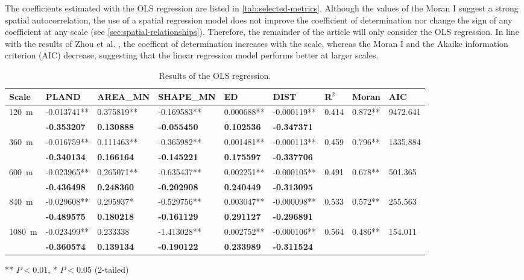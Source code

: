 \documentclass[12pt]{iopart}
\begin{document}
The coefficients estimated with the OLS regression are listed in \autoref{tab:selected-metrics}. Although the values of the Moran I \cite{moran1950notes} suggest a strong spatial autocorrelation, the use of a spatial regression model does not improve the coefficient of determination nor change the sign of any coefficient at any scale (see \ref{sec:spatial-relationships}). Therefore, the remainder of the article will only consider the OLS regression.
In line with the results of Zhou et al. \cite{zhou2017effects}, the coeffient of determination increases with the scale, whereas the Moran I and the Akaike information criterion (AIC) \cite{akaike1973information} decrease, suggesting that the linear regression model performs better at larger scales.

\begin{table}
  \caption{\label{tab:ols-regression} Results of the OLS regression.}
  \scriptsize %
  \begin{center}
    \begin{tabular}{ p{} p{} p{} p{} p{} p{} p{} p{} p{} }
      \toprule
      Scale & PLAND & AREA\_MN & SHAPE\_MN & ED & DIST & R$^2$ & Moran & AIC\\
      \midrule
      120~m & -0.013741** & 0.375819** & -0.169583** & 0.000688** & -0.000119** & 0.414 & 0.872** & 9472.641 \\
      & \textbf{-0.353207} & \textbf{0.130888} & \textbf{-0.055450} & \textbf{0.102536} & \textbf{-0.347371} \\
      360~m & -0.016759** & 0.111463** & -0.365982** & 0.001481** & -0.000113** & 0.459 & 0.796** & 1335.884 \\
      & \textbf{-0.340134} & \textbf{0.166164} & \textbf{-0.145221} & \textbf{0.175597} & \textbf{-0.337706} \\      
      600~m & -0.023965** & 0.265071** & -0.635437** & 0.002251** & -0.000105** & 0.491 & 0.678** & 501.365 \\
      & \textbf{-0.436498} & \textbf{0.248360} & \textbf{-0.202908} & \textbf{0.240449} & \textbf{-0.313095} \\
      840~m & -0.029608** & 0.295937* & -0.529756** & 0.003047** & -0.000098** & 0.533 & 0.572** & 255.563 \\
      & \textbf{-0.489575} & \textbf{0.180218} & \textbf{-0.161129} & \textbf{0.291127} & \textbf{-0.296891} \\
      1080~m & -0.023499** & 0.233338 & -1.413028** & 0.002752** & -0.000106** & 0.564 & 0.486** & 154.011 \\
      & \textbf{-0.360574} & \textbf{0.139134} & \textbf{-0.190122} & \textbf{0.233989} & \textbf{-0.311524} \\      
      \bottomrule
    \end{tabular}
  \end{center}
  ** $P < 0.01$, * $P < 0.05$ (2-tailed)
\end{table}
\end{document}
